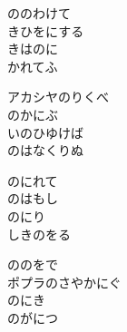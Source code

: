 \documentclass[10pt,b5j]{tarticle} %
\begin{document}
\vspace{1.5em} %
\newcommand{\linespace}{0.5em} %
\newcommand{\blocksize}{0.5\hsize} %
\begin{enumerate} %
    \begin{minipage}[c]{\blocksize}
    
        \vspace{\linespace}
        \item
        ののわけて\\
        きひをにする\\
        きはのに\\
        かれてふ
        
        \vspace{\linespace}
        \item
        アカシヤのりくべ\\
        のかにぶ\\
        いのひゆけば\\
        のはなくりぬ
        
        \vspace{\linespace}
        \item
        のにれて\\
        のはもし\\
        のにり\\
        しきのをる
        
        \vspace{\linespace}
        \item
        ののをで\\
        ポプラのさやかにぐ\\
        のにき\\
        のがにつ
        

\end{minipage}
\end{enumerate}
\end{document}
